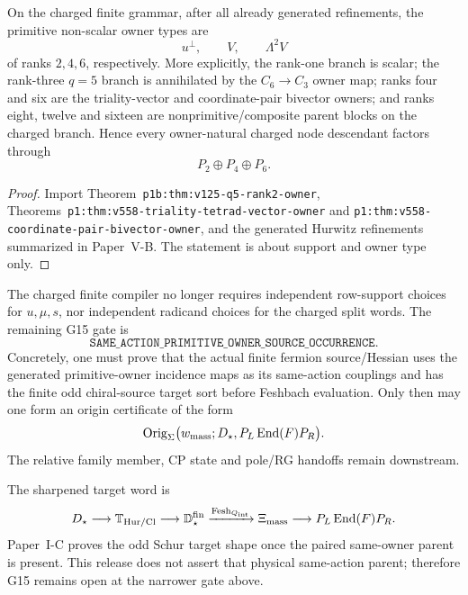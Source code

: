 \documentclass[12pt,a4paper]{article}
\begin{document}
\begin{theorem}
\label{p5:thm:v372-charged-primitive-owner-support}
On the charged finite grammar, after all already generated refinements, the
primitive non-scalar owner types are
\[
 \boxed{u^\perp,\qquad V,\qquad\Lambda^2V}
\]
of ranks \(2,4,6\), respectively.  More explicitly, the rank-one branch is
scalar; the rank-three \(q=5\) branch is annihilated by the
\(C_6\to C_3\) owner map; ranks four and six are the triality-vector and
coordinate-pair bivector owners; and ranks eight, twelve and sixteen are
nonprimitive/composite parent blocks on the charged branch.  Hence every
owner-natural charged node descendant factors through
\[
 \boxed{P_2\oplus P_4\oplus P_6}.
\]
\end{theorem}
\begin{proof}
Import Theorem~\texttt{p1b:thm:v125-\allowbreak q5-\allowbreak rank2-\allowbreak owner},
Theorems~\texttt{p1:thm:v558-\allowbreak triality-\allowbreak tetrad-\allowbreak vector-\allowbreak owner} and
\texttt{p1:thm:v558-\allowbreak coordinate-\allowbreak pair-\allowbreak bivector-\allowbreak owner}, and the generated
Hurwitz refinements summarized in Paper~V-B.  The statement is about support
and owner type only.
\end{proof}

\begin{corollary}
\label{p5:cor:v372-g15-contracted-residual}
The charged finite compiler no longer requires independent row-support choices
for \(u,\mu,s\), nor independent radicand choices for the charged split words.
The remaining G15 gate is
\[
 \boxed{\texttt{SAME\_ACTION\_PRIMITIVE\_OWNER\_SOURCE\_OCCURRENCE}}.
\]
Concretely, one must prove that the actual finite fermion source/Hessian uses
the generated primitive-owner incidence maps as its same-action couplings and
has the finite odd chiral-source target sort before Feshbach evaluation.  Only
then may one form an origin certificate of the form
\[
 \operatorname{Orig}_{\Sigma}
 \bigl(w_{\rm mass};D_\star,P_L\operatorname{End}(F)P_R\bigr).
\]
The relative family member, CP state and pole/RG handoffs remain downstream.
\end{corollary}

\begin{remark}
\label{p5:rem:v372-mass-pcad-target}
The sharpened target word is
\[
 D_\star\longrightarrow\mathbb T_{\rm Hur/Cl}
 \longrightarrow\mathbb D_\star^{\rm fin}
 \xrightarrow{\operatorname{Fesh}_{Q_{\rm int}}}
 \Xi_{\rm mass}
 \longrightarrow P_L\operatorname{End}(F)P_R.
\]
Paper~I-C proves the odd Schur target shape once the paired same-owner parent
is present.  This release does not assert that physical same-action parent;
therefore G15 remains open at the narrower gate above.
\end{remark}
\end{document}
